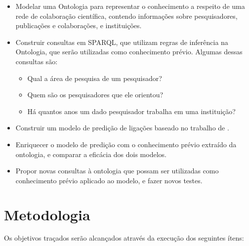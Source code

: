\begin{itemize}
    \item Modelar uma Ontologia para representar o conhecimento a respeito de uma rede de colaboração científica, contendo informações sobre pesquisadores, publicações e colaborações, e instituições.
    \item Construir consultas em SPARQL, que utilizam regras de inferência na Ontologia, que serão utilizadas como conhecimento prévio. Algumas dessas consultas são:
    \begin{itemize}
        \item Qual a área de pesquisa de um pesquisador?
        \item Quem são os pesquisadores que  ele orientou?
        \item Há quantos anos um dado pesquisador trabalha em uma instituição?
    \end{itemize}
    \item Construir um modelo de predição de ligações baseado no trabalho de \citet{Cervantes2014}.
    \item Enriquecer o modelo de predição com o conhecimento prévio extraído da ontologia, e comparar a eficácia dos dois modelos.
    \item Propor novas consultas à ontologia que possam ser utilizadas como conhecimento prévio aplicado ao modelo, e fazer novos testes.
\end{itemize}

\section{Metodologia}
\label{sec:metodologia}

Os objetivos traçados serão alcançados através da execução dos seguintes ítens:

